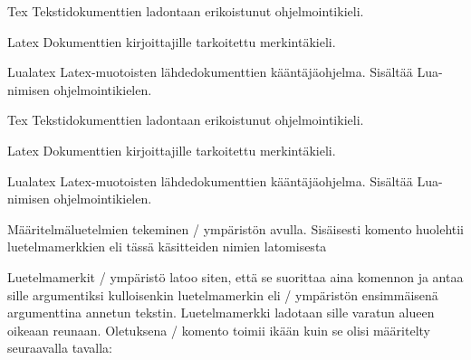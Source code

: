 \begin{esimerkki*}

\begin{koodilohko}
\begin{list}{}{
    \renewcommand{\makelabel}[1]{\textsc{#1:}}
    \setlength{\leftmargin}{1.5em}
    \setlength{\labelwidth}{1.5em}
    \setlength{\itemindent}{1em}
    \setlength{\labelsep}{1em}
    \setlength{\itemsep}{.2ex}
  }
\item[Tex] Tekstidokumenttien ladontaan erikoistunut ohjelmointikieli.
\item[Latex] Dokumenttien kirjoittajille tarkoitettu merkintäkieli.
\item[Lualatex] Latex-muotoisten lähdedokumenttien kääntäjäohjelma.
  Sisältää Lua-nimi\-sen ohjelmointikielen.
\end{list}
\end{koodilohko}
  \begin{tulos}
    \begin{list}{}{
        \renewcommand{\makelabel}[1]{\textsc{#1:}}
        \setlength{\leftmargin}{1.5em}
        \setlength{\labelwidth}{1.5em}
        \setlength{\itemindent}{1em}
        \setlength{\labelsep}{1em}
        \setlength{\itemsep}{.2ex}
      }
    \item[Tex] Tekstidokumenttien ladontaan erikoistunut ohjelmointikieli.
    \item[Latex] Dokumenttien kirjoittajille tarkoitettu merkintäkieli.
    \item[Lualatex] Latex-muotoisten lähdedokumenttien kääntäjäohjelma.
      Sisältää Lua-nimi\-sen ohjelmointikielen.
    \end{list}
  \end{tulos}
  \caption{Määritelmäluetelmien tekeminen \-/ ympäristön
    avulla. Sisäisesti komento  huolehtii
    luetelmamerkkien eli tässä käsitteiden nimien latomisesta}
  \label{esim:list_makelabel}
\end{esimerkki*}

Luetelmamerkit \-/ ympäristö latoo siten, että se
suorittaa aina komennon  ja antaa sille argumentiksi
kulloisenkin luetelmamerkin eli \-/ ympäristön
ensimmäisenä argumenttina annetun tekstin. Luetelmamerkki ladotaan sille
varatun alueen oikeaan reunaan. Oletuksena \-/
komento toimii ikään kuin se olisi määritelty seuraavalla tavalla:

